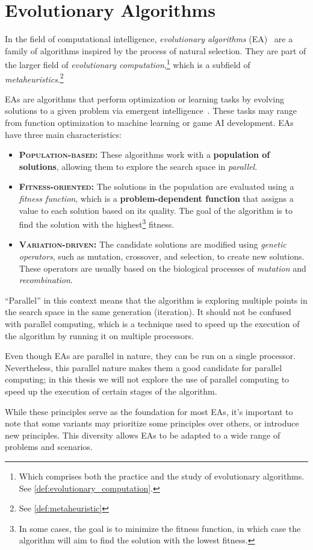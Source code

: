 \section{Evolutionary Algorithms}
\label{sec:evolutionary_algorithms}
  In the field of computational intelligence, \emph{evolutionary algorithms} 
  (EA)~\autocite{yuIntroductionEvolutionaryAlgorithms2010} are a family of algorithms inspired by the process of 
  natural selection. They are part of the larger field of \textit{evolutionary computation},\footnote{Which comprises both the practice and the study of evolutionary algorithms. See \vref{def:evolutionary_computation}.} which is a 
  subfield of \textit{metaheuristics}.\footnote{See \vref{def:metaheuristic}}

  EAs are algorithms that perform optimization or learning tasks by evolving solutions to a given problem via emergent 
  intelligence~\autocite{peterj.angelineGeneticProgrammingEmergent1994}. These tasks may range from function 
  optimization to machine learning or game AI development. EAs have three main characteristics:

  \begin{itemize}
    \item \textbf{\textsc{Population-based:}} These algorithms work with a \textbf{population of solutions}, allowing 
      them to explore the search space in \textit{parallel}.
    \item \textbf{\textsc{Fitness-oriented}:} The solutions in the population are evaluated using a \emph{fitness 
      function}, which is a \textbf{problem-dependent function} that assigns a value to each solution based on its 
      quality. The goal of the algorithm is to find the solution with the highest\footnote{
        In some cases, the goal is to minimize the fitness function, in which case the algorithm will aim to find the 
        solution with the lowest fitness.
      } fitness.
    \item \textbf{\textsc{Variation-driven}:} The candidate solutions are modified using \emph{genetic operators}, such 
      as mutation, crossover, and selection, to create new solutions. These operators are usually based on the 
      biological processes of \textit{mutation} and \textit{recombination}.
  \end{itemize}
  
  \begin{remark}
    \enquote{Parallel} in this context means that the algorithm is exploring multiple points in the search space in the
    same generation (iteration). It should not be confused with parallel computing, which is a technique used to speed
    up the execution of the algorithm by running it on multiple processors.

    Even though EAs are parallel in nature, they can be run on a single processor. Nevertheless, this parallel nature
    makes them a good candidate for parallel computing; in this thesis we will not explore the use of parallel computing
    to speed up the execution of certain stages of the algorithm.
  \end{remark}

  While these principles serve as the foundation for most EAs, it's important to note that some variants may prioritize 
  some principles over others, or introduce new principles. This diversity allows EAs to be adapted to a wide range of 
  problems and scenarios.
